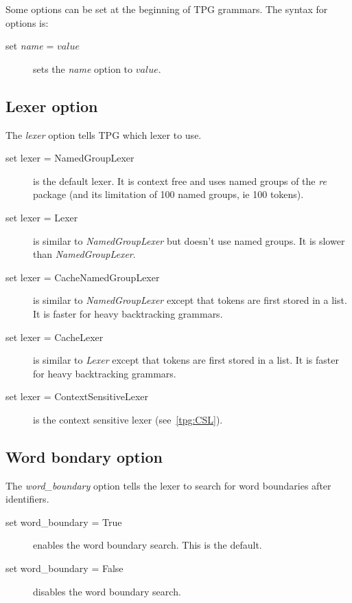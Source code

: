 Some options can be set at the beginning of TPG grammars.
The syntax for options is:

\begin{description}
    \item [set \emph{name} = \emph{$value$}] sets the \emph{name} option to \emph{$value$}.
\end{description}

\subsection{Lexer option}                                   \label{grammar:lexer_option}

The \emph{lexer} option tells TPG which lexer to use.

\begin{description}
    \item [set lexer = NamedGroupLexer] is the default lexer.
        It is context free and uses named groups of the \emph{re} package (and its limitation of 100 named groups, ie 100 tokens).
    \item [set lexer = Lexer] is similar to \emph{NamedGroupLexer} but doesn't use named groups.
        It is slower than \emph{NamedGroupLexer}.
    \item [set lexer = CacheNamedGroupLexer] is similar to \emph{NamedGroupLexer} except that tokens are first stored in a list.
        It is faster for heavy backtracking grammars.
    \item [set lexer = CacheLexer] is similar to \emph{Lexer} except that tokens are first stored in a list.
        It is faster for heavy backtracking grammars.
    \item [set lexer = ContextSensitiveLexer] is the context sensitive lexer (see~\ref{tpg:CSL}).
\end{description}

\subsection{Word bondary option}                            \label{grammar:word_boundary_option}

The \emph{word\_boundary} option tells the lexer to search for word boundaries after identifiers.

\begin{description}
    \item [set word\_boundary = True] enables the word boundary search. This is the default.
    \item [set word\_boundary = False] disables the word boundary search.
\end{description}

